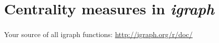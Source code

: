 \documentclass[8pt]{beamer}
\begin{document}




\section{Centrality measures in \textit{igraph}}

\bgroup
{}
\begin{frame}[plain]{}
\begin{center}
\color{white}{\Huge\insertsection}
\end{center}
\end{frame}
\egroup


\begin{frame}
\frametitle{\insertsection}

Your source of all igraph functions: \url{http://igraph.org/r/doc/}

\end{frame}

\end{document}
